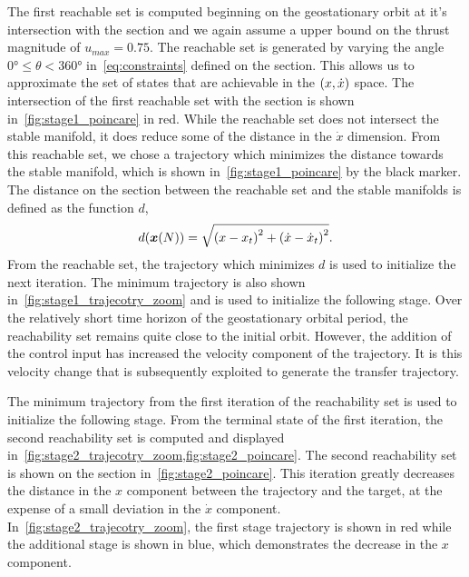 \documentclass[smallcondensed]{svjour3}
\begin{document}
The first reachable set is computed beginning on the geostationary orbit at it's intersection with the \Poincare section and we again assume a upper bound on the thrust magnitude of \( u_{max} = 0.75 \).
The reachable set is generated by varying the angle \( \ang{0} \leq \theta < \ang{360} \) in~\cref{eq:constraints} defined on the \Poincare section.
This allows us to approximate the set of states that are achievable in the \( \left( x ,\dot{x} \right) \) space.
The intersection of the first reachable set with the \Poincare section is shown in~\cref{fig:stage1_poincare} in red.
While the reachable set does not intersect the stable manifold, it does reduce some of the distance in the \(\dot{x}\) dimension.
From this reachable set, we chose a trajectory which minimizes the distance towards the stable manifold, which is shown in~\cref{fig:stage1_poincare} by the black marker.
The distance on the \Poincare section between the reachable set and the stable manifolds is defined as the function \( d \),
\begin{align*}
        d(\bm{x}(N)) = \sqrt{\left( x - x_t \right)^2 + \left( \dot{x} - \dot{x}_t \right)^2}.
\end{align*}
From the reachable set, the trajectory which minimizes \( d \) is used to initialize the next iteration.
The minimum trajectory is also shown in~\cref{fig:stage1_trajecotry_zoom} and is used to initialize the following stage.
Over the relatively short time horizon of the geostationary orbital period, the reachability set remains quite close to the initial orbit. 
However, the addition of the control input has increased the velocity component of the trajectory.
It is this velocity change that is subsequently exploited to generate the transfer trajectory.

The minimum trajectory from the first iteration of the reachability set is used to initialize the following stage.
From the terminal state of the first iteration, the second reachability set is computed and displayed in~\cref{fig:stage2_trajecotry_zoom,fig:stage2_poincare}.
The second reachability set is shown on the \Poincare section in~\cref{fig:stage2_poincare}.
This iteration greatly decreases the distance in the \( x \) component between the trajectory and the target, at the expense of a small deviation in the \( \dot{x} \) component.
In~\cref{fig:stage2_trajecotry_zoom}, the first stage trajectory is shown in red while the additional stage is shown in blue, which demonstrates the decrease in the \( x \) component.
\end{document}
